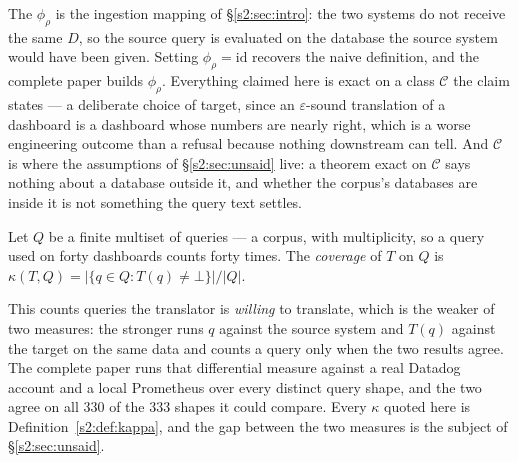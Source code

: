 \noindent
The $\phi_\rho$ is the ingestion mapping of \S\ref{s2:sec:intro}: the two systems do not
receive the same $D$, so the source query is evaluated on the database the source system
would have been given. Setting $\phi_\rho=\mathrm{id}$ recovers the naive definition, and
the complete paper builds $\phi_\rho$. Everything claimed here is exact on a class
$\mathcal{C}$ the claim states --- a deliberate choice of target, since an
$\varepsilon$-sound translation of a dashboard is a dashboard whose numbers are nearly
right, which is a worse engineering outcome than a refusal because nothing downstream can
tell. And $\mathcal{C}$ is where the assumptions of \S\ref{s2:sec:unsaid} live: a theorem
exact on $\mathcal{C}$ says nothing about a database outside it, and whether the corpus's
databases are inside it is not something the query text settles.

\begin{definition}[Coverage]\label{s2:def:kappa}
Let $Q$ be a finite multiset of queries --- a corpus, with multiplicity, so a query used
on forty dashboards counts forty times. The \emph{coverage} of $T$ on $Q$ is
$\kappa(T,Q)=|\{q\in Q : T(q)\neq\bot\}|/|Q|$.
\end{definition}

\noindent
This counts queries the translator is \emph{willing} to translate, which is the weaker of
two measures: the stronger runs $q$ against the source system and $T(q)$ against the target
on the same data and counts a query only when the two results agree. The complete paper runs
that differential measure against a real Datadog account and a local Prometheus over every
distinct query shape, and the two agree on all $330$ of the $333$ shapes it could compare.
Every $\kappa$ quoted here is Definition~\ref{s2:def:kappa}, and the gap between the two
measures is the subject of \S\ref{s2:sec:unsaid}.

